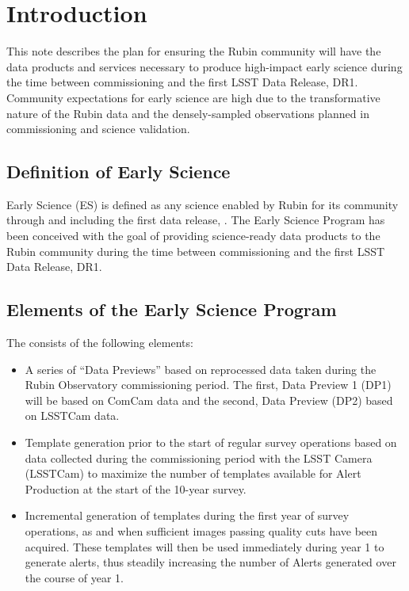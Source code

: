 \section{Introduction}

This note describes the plan for ensuring the Rubin community will have the data products and services necessary to produce high-impact early science during the time between commissioning and the first LSST Data Release, DR1.  
Community expectations for early science are high due to the transformative nature of the Rubin data and the densely-sampled observations planned in commissioning and science validation.

\subsection{Definition of Early Science}  \label{ssec:defn}

Early Science (ES) is defined as any science enabled by Rubin for its community through and including the first data release, \drone.
The Early Science Program has been conceived with the goal of providing science-ready data products to the Rubin community during the time between commissioning and the first LSST Data Release, DR1.

\subsection{Elements of the Early Science Program}

The \esp consists of the following elements:
\begin{itemize}
	\item A series of ``Data Previews'' based on reprocessed data taken during the Rubin Observatory commissioning period. The first, Data Preview 1 (DP1) will be based on ComCam data and the second, Data Preview (DP2) based on LSSTCam data. 
	\item Template generation prior to the start of regular survey operations based on data collected during the commissioning period with the LSST Camera (LSSTCam) to maximize the number of templates available for Alert Production at the start of the 10-year survey.
	\item Incremental generation of templates during the first year of survey operations, as and when sufficient images passing quality cuts have been acquired. These templates will then be used immediately during year 1 to generate alerts, thus steadily increasing the number of Alerts generated over the course of year 1. 
\end{itemize}

